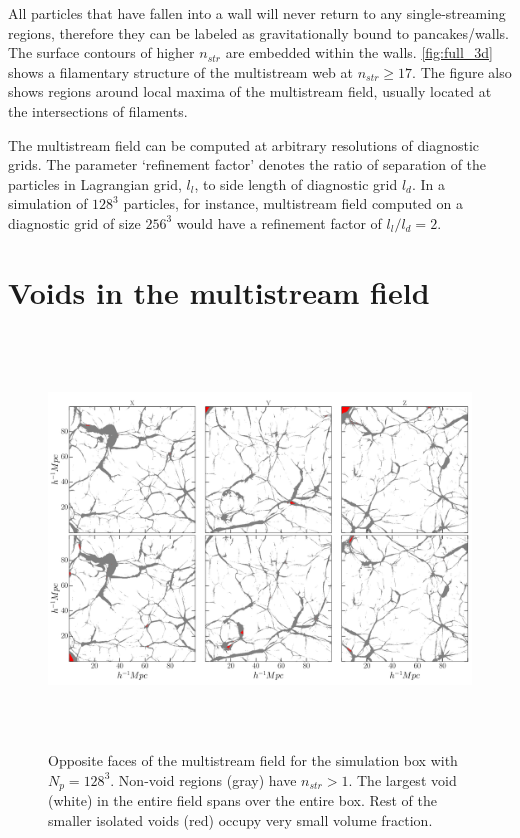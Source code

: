 All particles that have fallen into a wall will never return to any single-streaming regions, therefore they can be labeled as gravitationally bound to pancakes/walls. The surface contours of higher $n_{str}$ are embedded within the walls. \autoref{fig:full_3d} shows a filamentary structure of the multistream web at $n_{str} \geq 17$. The figure also shows regions around local maxima of the multistream field, usually located at the intersections of filaments.    


The multistream field can be computed at arbitrary resolutions of diagnostic grids. The parameter `refinement factor' denotes the ratio of separation of the particles in Lagrangian grid, $l_l$, to side length of diagnostic grid $l_d$. In a simulation of $128^3$ particles, for instance, multistream field computed on a diagnostic grid of size $256^3$ would have a refinement factor of $l_l/l_d = 2$. 

\section{Voids in the multistream field}
\label{sec:voids}

\begin{figure}
\begin{minipage}[t]{0.99\linewidth}
 \centering\includegraphics[height=11cm]{Chapter4/Source_v2/fig2.pdf} 
\end{minipage}\hfill
\caption{Opposite faces of the multistream field for the simulation box with $N_p = 128^3$. Non-void regions (gray) have $n_{str} > 1$. The largest void (white) in the entire field spans over the entire box. Rest of the smaller isolated voids (red) occupy very small volume fraction. }
\label{fig:voidFace}
\end{figure}


